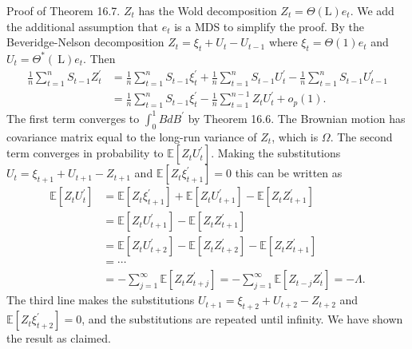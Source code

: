 \documentclass[10pt]{article}
\begin{document}
Proof of Theorem 16.7. $Z_{t}$ has the Wold decomposition $Z_{t}=\Theta(\mathrm{L}) e_{t}$. We add the additional assumption that $e_{t}$ is a MDS to simplify the proof. By the Beveridge-Nelson decomposition $Z_{t}=\xi_{t}+U_{t}-U_{t-1}$ where $\xi_{t}=\Theta(1) e_{t}$ and $U_{t}=\Theta^{*}(\mathrm{~L}) e_{t}$. Then
$$
\begin{aligned}
\frac{1}{n} \sum_{t=1}^{n} S_{t-1} Z_{t}^{\prime} &=\frac{1}{n} \sum_{t=1}^{n} S_{t-1} \xi_{t}^{\prime}+\frac{1}{n} \sum_{t=1}^{n} S_{t-1} U_{t}^{\prime}-\frac{1}{n} \sum_{t=1}^{n} S_{t-1} U_{t-1}^{\prime} \\
&=\frac{1}{n} \sum_{t=1}^{n} S_{t-1} \xi_{t}^{\prime}-\frac{1}{n} \sum_{t=1}^{n-1} Z_{t} U_{t}^{\prime}+o_{p}(1) .
\end{aligned}
$$
The first term converges to $\int_{0}^{1} B d B^{\prime}$ by Theorem 16.6. The Brownian motion has covariance matrix equal to the long-run variance of $Z_{t}$, which is $\Omega$. The second term converges in probability to $\mathbb{E}\left[Z_{t} U_{t}^{\prime}\right]$. Making the substitutions $U_{t}=\xi_{t+1}+U_{t+1}-Z_{t+1}$ and $\mathbb{E}\left[Z_{t} \xi_{t+1}^{\prime}\right]=0$ this can be written as
$$
\begin{aligned}
\mathbb{E}\left[Z_{t} U_{t}^{\prime}\right] &=\mathbb{E}\left[Z_{t} \xi_{t+1}^{\prime}\right]+\mathbb{E}\left[Z_{t} U_{t+1}^{\prime}\right]-\mathbb{E}\left[Z_{t} Z_{t+1}^{\prime}\right] \\
&=\mathbb{E}\left[Z_{t} U_{t+1}^{\prime}\right]-\mathbb{E}\left[Z_{t} Z_{t+1}^{\prime}\right] \\
&=\mathbb{E}\left[Z_{t} U_{t+2}^{\prime}\right]-\mathbb{E}\left[Z_{t} Z_{t+2}^{\prime}\right]-\mathbb{E}\left[Z_{t} Z_{t+1}^{\prime}\right] \\
&=\cdots \\
&=-\sum_{j=1}^{\infty} \mathbb{E}\left[Z_{t} Z_{t+j}^{\prime}\right]=-\sum_{j=1}^{\infty} \mathbb{E}\left[Z_{t-j} Z_{t}^{\prime}\right]=-\Lambda .
\end{aligned}
$$
The third line makes the substitutions $U_{t+1}=\xi_{t+2}+U_{t+2}-Z_{t+2}$ and $\mathbb{E}\left[Z_{t} \xi_{t+2}^{\prime}\right]=0$, and the substitutions are repeated until infinity. We have shown the result as claimed.
\end{document}
